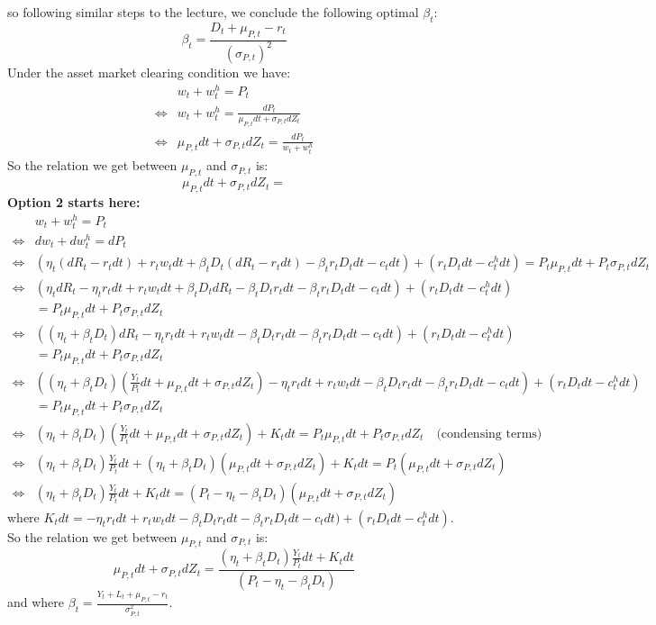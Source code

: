 \documentclass{article}
\begin{document}
so following similar steps to the lecture, we conclude the following optimal $\beta_t$:
\[
\beta_t = \frac{D_t + \mu_{P, t} - r_t}{(\sigma_{P, t})^2}    
\]
Under the asset market clearing condition we have:
\[\begin{aligned}
    &w_t + w_t^h = P_t   \\ 
    \iff & w_t + w_t^h = \frac{d P_t}{\mu_{P, t} d t + \sigma_{P, t} d Z_t}\\
    \iff & \mu_{P, t} d t + \sigma_{P, t} d Z_t = \frac{d P_t}{w_t + w_t^h}
\end{aligned}\]
So the relation we get between $\mu_{P, t}$ and $\sigma_{P, t }$ is:
\[
    \mu_{P, t} d t + \sigma_{P, t} d Z_t =     
\]
\textbf{Option 2 starts here:}
\[
\begin{aligned}
    &w_t + w_t^h = P_t   \\ 
    \iff & d w_t + d w_t^h = d P_t \\
    \iff & (\eta_t  (d R_t - r_t d t)  + r_t w_t d t + \beta_t D_t (d R_t - r_t d t) - \beta_t r_t D_t d t  - c_t d t) + (r_t D_t d t  - c_t^h d t) =  P_t \mu_{P, t} d t+P_t \sigma_{P, t} d Z_{t} \\ %
    \iff &(\eta_t  d R_t - \eta_t r_t d t  + r_t w_t d t + \beta_t D_t d R_t - \beta_t D_t r_t d t - \beta_t r_t D_t d t  - c_t d t) + (r_t D_t d t  - c_t^h d t) \\
    &=  P_t \mu_{P, t} d t+P_t \sigma_{P, t} d Z_{t}\\
    \iff &((\eta_t + \beta_t D_t)  d R_t - \eta_t r_t d t  + r_t w_t d t - \beta_t D_t r_t d t - \beta_t r_t D_t d t  - c_t d t) + (r_t D_t d t  - c_t^h d t) \\
    &=  P_t \mu_{P, t} d t+P_t \sigma_{P, t} d Z_{t}\\
    \iff &((\eta_t + \beta_t D_t)  (\frac{Y_t}{P_t} d t + \mu_{P, t} d t+\sigma_{P, t} d Z_{t}  ) - \eta_t r_t d t  + r_t w_t d t - \beta_t D_t r_t d t - \beta_t r_t D_t d t  - c_t d t) + (r_t D_t d t  - c_t^h d t) \\
    &=  P_t \mu_{P, t} d t+P_t \sigma_{P, t} d Z_{t}\\
    \iff & (\eta_t + \beta_t D_t)  (\frac{Y_t}{P_t} d t + \mu_{P, t} d t+\sigma_{P, t} d Z_{t}  )  + K_t d t=  P_t \mu_{P, t} d t+P_t \sigma_{P, t} d Z_{t} \quad \text{(condensing terms)}\\
    \iff & (\eta_t + \beta_t D_t) \frac{Y_t}{P_t} d t + (\eta_t + \beta_t D_t) (\mu_{P, t} d t+\sigma_{P, t} d Z_{t}) + K_t d t= P_t (\mu_{P, t} d t+\sigma_{P, t} d Z_{t})\\
    \iff & (\eta_t + \beta_t D_t) \frac{Y_t}{P_t} d t + K_t d t= (P_t - \eta_t - \beta_t D_t)(\mu_{P, t} d t+\sigma_{P, t} d Z_{t})
\end{aligned}
\]
where $K_t d t= - \eta_t r_t d t  + r_t w_t d t - \beta_t D_t r_t d t - \beta_t r_t D_t d t  - c_t d t) + (r_t D_t d t  - c_t^h d t)$.
So the relation we get between $\mu_{P, t}$ and $\sigma_{P, t }$ is:
\[
    \mu_{P, t} d t+\sigma_{P, t} d Z_{t} = \frac{(\eta_t + \beta_t D_t) \frac{Y_t}{P_t} d t + K_t d t}{(P_t - \eta_t - \beta_t D_t)}
\]
and where $\beta_t = \frac{Y_t + L_t + \mu_{P, t} - r_t}{\sigma_{P, t}^2}$.
\end{document}
